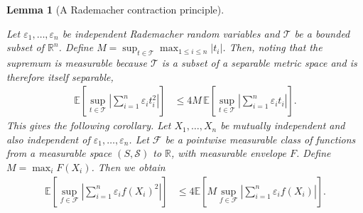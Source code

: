 \documentclass[11pt,lof]{puthesis}
\newcommand{\R}{\ensuremath{\mathbb{R}}}
\newcommand{\E}{\ensuremath{\mathbb{E}}}
\newcommand{\cF}{\ensuremath{\mathcal{F}}}
\newcommand{\cS}{\ensuremath{\mathcal{S}}}
\newcommand{\cT}{\ensuremath{\mathcal{T}}}
\theoremstyle{break}
\newtheorem{lemma}{Lemma}[section]
\theoremstyle{proof}
\begin{document}
\begin{lemma}[A Rademacher contraction principle]
  \label{lem:kernel_app_contraction}

  Let $\varepsilon_1, \ldots, \varepsilon_n$
  be independent Rademacher random variables
  and $\cT$ be a bounded subset of $\R^n$.
  Define
  $M = \sup_{t \in \cT} \max_{1 \leq i \leq n} |t_i|$.
  Then, noting that the supremum is measurable
  because $\cT$ is a subset of a separable metric space
  and is therefore itself separable,
  \begin{align*}
    \E
    \left[
      \sup_{t \in \cT}
      \left|
      \sum_{i=1}^n
      \varepsilon_i
      t_i^2
      \right|
    \right]
    &\leq
    4M \,
    \E
    \left[
      \sup_{t \in \cT}
      \left|
      \sum_{i=1}^n
      \varepsilon_i
      t_i
      \right|
    \right].
  \end{align*}
  This gives the following corollary.
  Let $X_1, \ldots, X_n$ be mutually independent
  and also independent of $\varepsilon_1, \ldots, \varepsilon_n$.
  Let $\cF$ be a pointwise measurable class of functions
  from a measurable space $(S, \cS)$ to $\R$,
  with measurable envelope $F$.
  Define $M = \max_i F(X_i)$.
  Then we obtain
  \begin{align*}
    \E
    \left[
      \sup_{f \in \cF}
      \left|
      \sum_{i=1}^n
      \varepsilon_i
      f(X_i)^2
      \right|
    \right]
    &\leq
    4
    \E
    \left[
      M
      \sup_{f \in \cF}
      \left|
      \sum_{i=1}^n
      \varepsilon_i
      f(X_i)
      \right|
    \right].
  \end{align*}

\end{lemma}
\end{document}
